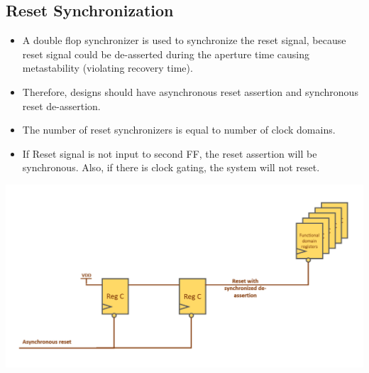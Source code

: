 \documentclass[11pt]{article}
\begin{document}
\subsection*{Reset Synchronization}
\begin{itemize}
    \item A double flop synchronizer is used to synchronize the reset signal, because reset signal could be de-asserted during the aperture time causing metastability (violating recovery time).
    \item Therefore, designs should have asynchronous reset assertion and synchronous reset de-assertion.
    \item The number of reset synchronizers is equal to number of clock domains.
    \item If Reset signal is not input to second FF, the reset assertion will be synchronous. Also, if there is clock gating, the system will not reset.
\end{itemize}
\begin{center}
    \includegraphics[scale=0.5]{6.png}
\end{center}
\end{document}
